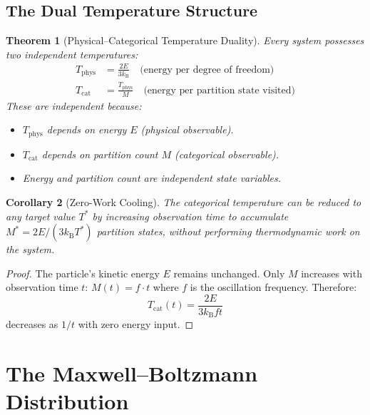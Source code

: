 \documentclass[twocolumn,10pt,a4paper]{article}
\theoremstyle{plain}
\newtheorem{theorem}{Theorem}[section]
\newtheorem{corollary}[theorem]{Corollary}
\theoremstyle{definition}
\theoremstyle{remark}
\newcommand{\kB}{k_{\mathrm{B}}}
\begin{document}
\subsection{The Dual Temperature Structure}

\begin{theorem}[Physical--Categorical Temperature Duality]
\label{thm:dual_temp}
Every system possesses two independent temperatures:
\begin{align}
    T_{\mathrm{phys}} &= \frac{2E}{3\kB} \quad \text{(energy per degree of freedom)} \\
    T_{\mathrm{cat}} &= \frac{T_{\mathrm{phys}}}{M} \quad \text{(energy per partition state visited)}
\end{align}
These are independent because:
\begin{itemize}
    \item $T_{\mathrm{phys}}$ depends on energy $E$ (physical observable).
    \item $T_{\mathrm{cat}}$ depends on partition count $M$ (categorical observable).
    \item Energy and partition count are independent state variables.
\end{itemize}
\end{theorem}

\begin{corollary}[Zero-Work Cooling]
\label{cor:zero_work}
The categorical temperature can be reduced to any target value $T^*$ by increasing observation time to accumulate $M^* = 2E/(3\kB T^*)$ partition states, without performing thermodynamic work on the system.
\end{corollary}

\begin{proof}
The particle's kinetic energy $E$ remains unchanged. Only $M$ increases with observation time $t$: $M(t) = f \cdot t$ where $f$ is the oscillation frequency. Therefore:
\begin{equation}
    T_{\mathrm{cat}}(t) = \frac{2E}{3\kB f t}
\end{equation}
decreases as $1/t$ with zero energy input.
\end{proof}

\section{The Maxwell--Boltzmann Distribution}
\label{sec:maxwell}
\end{document}
